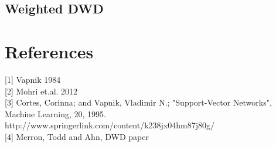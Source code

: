 \documentclass[12pt]{article}
\theoremstyle{definition}
\theoremstyle{remark}
\numberwithin{equation}{section}
\begin{document}
\subsection{Weighted DWD}

\section{References}
[1] Vapnik 1984 \\[0.2cm]
[2] Mohri et.al. 2012 \\ [0.2cm]
[3] Cortes, Corinna; and Vapnik, Vladimir N.; "Support-Vector Networks", Machine Learning, 20, 1995.\\ http://www.springerlink.com/content/k238jx04hm87j80g/ \\[0.2cm]
[4] Merron, Todd and Ahn, DWD paper
\end{document}
